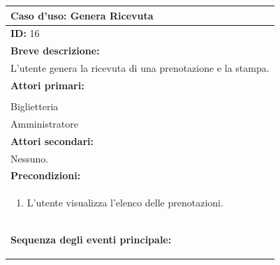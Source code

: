 \documentclass{article}
\begin{document}
                \begin{table}[H]
                    \begin{tabular}{|p{\linewidth}|}
                        \hline
                        \cellcolor{gray!100}
                        \color{white}
                        \centerline{\textbf{Caso d'uso:} Genera Ricevuta} \\
                        \hline
                        \textbf{ID:} 16 \\
                        \hline
                        \cellcolor{gray!20}
                        \textbf{Breve descrizione:} \\
                        \cellcolor{gray!20}
                        L'utente genera la ricevuta di una prenotazione e la stampa. \\
                        \hline
                        \textbf{Attori primari:} \\
                        \begin{minipage}{\linewidth}
                            Cliente \\
                            Biglietteria \\
                            Amministratore
                        \end{minipage}
                        \vspace{0pt} \\
                        \hline
                        \textbf{Attori secondari:} \\
                        Nessuno. \\
                        \hline
                        \cellcolor{gray!20}
                        \textbf{Precondizioni:} \\
                        \cellcolor{gray!20}
                        \begin{minipage}{\linewidth}
                            \begin{enumerate}
                                \item L'utente visualizza l'elenco delle prenotazioni. %
                            \end{enumerate}
                        \end{minipage} \\
                        \hline
                        \textbf{Sequenza degli eventi principale:}
                        \begin{enumerate}

\end{enumerate}
\end{tabular}
\end{table}
\end{document}
